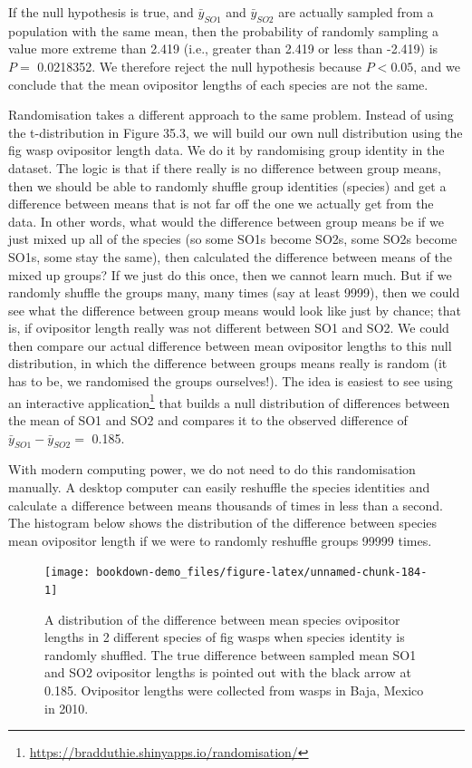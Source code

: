 \documentclass[
]{scrbook}
\begin{document}
If the null hypothesis is true, and \(\bar{y}_{SO1}\) and \(\bar{y}_{SO2}\) are actually sampled from a population with the same mean, then the probability of randomly sampling a value more extreme than 2.419 (i.e., greater than 2.419 or less than -2.419) is \(P =\) 0.0218352.
We therefore reject the null hypothesis because \(P < 0.05\), and we conclude that the mean ovipositor lengths of each species are not the same.

Randomisation takes a different approach to the same problem.
Instead of using the t-distribution in Figure 35.3, we will build our own null distribution using the fig wasp ovipositor length data.
We do it by randomising group identity in the dataset.
The logic is that if there really is no difference between group means, then we should be able to randomly shuffle group identities (species) and get a difference between means that is not far off the one we actually get from the data.
In other words, what would the difference between group means be if we just mixed up all of the species (so some SO1s become SO2s, some SO2s become SO1s, some stay the same), then calculated the difference between means of the mixed up groups?
If we just do this once, then we cannot learn much.
But if we randomly shuffle the groups many, many times (say at least 9999), then we could see what the difference between group means would look like just by chance; that is, if ovipositor length really was not different between SO1 and SO2.
We could then compare our actual difference between mean ovipositor lengths to this null distribution, in which the difference between groups means really is random (it has to be, we randomised the groups ourselves!).
The idea is easiest to see using an interactive application\footnote{\url{https://bradduthie.shinyapps.io/randomisation/}} that builds a null distribution of differences between the mean of SO1 and SO2 and compares it to the observed difference of \(\bar{y}_{SO1} - \bar{y}_{SO2} =\) 0.185.

With modern computing power, we do not need to do this randomisation manually.
A desktop computer can easily reshuffle the species identities and calculate a difference between means thousands of times in less than a second.
The histogram below shows the distribution of the difference between species mean ovipositor length if we were to randomly reshuffle groups 99999 times.

\begin{figure}
\texttt{[image: bookdown-demo\_files/figure-latex/unnamed-chunk-184-1]} \caption{A distribution of the difference between mean species ovipositor lengths in 2 different species of fig wasps when species identity is randomly shuffled. The true difference between sampled mean SO1 and SO2 ovipositor lengths is pointed out with the black arrow at 0.185. Ovipositor lengths were collected from wasps in Baja, Mexico in 2010.}\label{fig:unnamed-chunk-184}
\end{figure}
\end{document}
